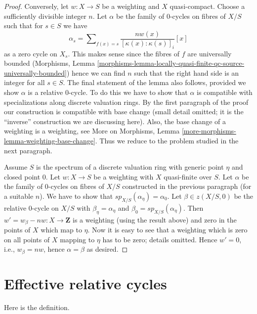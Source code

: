 \begin{proof}
\medskip\noindent
Conversely, let $w : X \to S$ be a weighting and $X$ quasi-compact.
Choose a sufficiently divisible integer $n$. Let $\alpha$ be the family
of $0$-cycles on fibres of $X/S$ such that for $s \in S$ we have
$$
\alpha_s =
\sum\nolimits_{f(x) = s} \frac{n w(x)}{[\kappa(x) : \kappa(s)]_i} [x]
$$
as a zero cycle on $X_s$.
This makes sense since the fibres of $f$ are universally bounded
(Morphisms, Lemma
\ref{morphisms-lemma-locally-quasi-finite-qc-source-universally-bounded})
hence we can find $n$ such that the right hand side is an integer for
all $s \in S$. The final statement of the lemma also follows, provided
we show $\alpha$ is a relative $0$-cycle. To do this we have to
show that $\alpha$ is compatible with specializations along discrete
valuation rings. By the first paragraph of the proof our construction
is compatible with base change (small detail omitted; it is the ``inverse''
construction we are discussing here). Also, the base
change of a weighting is a weighting, see
More on Morphisms, Lemma \ref{more-morphisms-lemma-weighting-base-change}.
Thus we reduce to the problem studied in the next paragraph.

\medskip\noindent
Assume $S$ is the spectrum of a discrete valuation ring with generic
point $\eta$ and closed point $0$. Let $w : X \to S$ be a weighting with
$X$ quasi-finite over $S$. Let $\alpha$ be the family of $0$-cycles on
fibres of $X/S$ constructed in the previous paragraph (for a suitable $n$).
We have to show that $sp_{X/S}(\alpha_\eta) = \alpha_0$.
Let $\beta \in z(X/S, 0)$ be the relative $0$-cycle on $X/S$
with $\beta_\eta = \alpha_\eta$ and $\beta_0 = sp_{X/S}(\alpha_\eta)$.
Then $w' = w_\beta - nw : X \to \mathbf{Z}$
is a weighting (using the result above) and zero in the points of $X$
which map to $\eta$. Now it is easy to see that a weighting which
is zero on all points of $X$ mapping to $\eta$ has to be zero;
details omitted. Hence $w' = 0$, i.e., $w_\beta = nw$, hence
$\alpha = \beta$ as desired.
\end{proof}









\section{Effective relative cycles}
\label{section-effective}


\noindent
Here is the definition.

